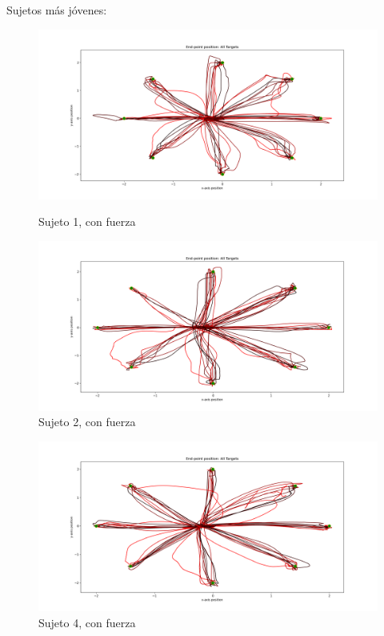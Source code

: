 \documentclass[a4paper,11pt, oneside]{book}
\begin{document}
Sujetos más jóvenes:
\\
\begin{figure}[h]
	\begin{minipage}[b]{0.5\linewidth}
		\centering
		\includegraphics[width=\linewidth]{sujeto1/force/trayectorias}
		\caption{Sujeto 1, con fuerza}
		\label{fig:figura1}
	\end{minipage}
	\hspace{0.5cm}
	\begin{minipage}[b]{0.5\linewidth}
		\centering
		\includegraphics[width=\linewidth]{sujeto2/force/trayectorias}
		\caption{Sujeto 2, con fuerza}
		\label{fig:figura2}
	\end{minipage}
\end{figure}
\begin{figure}[h]
	\begin{minipage}[b]{0.5\linewidth}
		\centering
		\includegraphics[width=\linewidth]{sujeto4/force/trayectorias}
		\caption{Sujeto 4, con fuerza}
		\label{fig:figura1}
	\end{minipage}
\end{figure}
\end{document}
